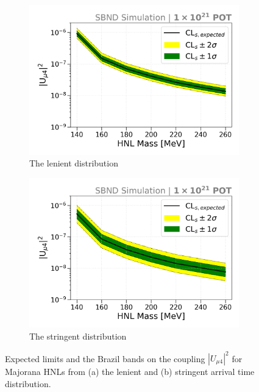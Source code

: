 \begin{figure}[b!]
        \begin{subfigure}[b]{0.495\textwidth}
            \includegraphics[width=\textwidth]{sensitivity_loose}
            \caption{The lenient distribution}%
        \end{subfigure}
        \begin{subfigure}[b]{0.495\textwidth}
            \includegraphics[width=\textwidth]{sensitivity_strict}
            \caption{The stringent distribution}%
        \end{subfigure}
    \caption[Expected Limits on the Coupling $|U_{\mu4}|^2$ for Majorana HNLs]{
    Expected limits and the Brazil bands on the coupling $|U_{\mu4}|^2$ for Majorana HNLs from (a) the lenient and (b) stringent arrival time distribution.
    }
    \label{fig:nupi0_reco_result}
\end{figure}

